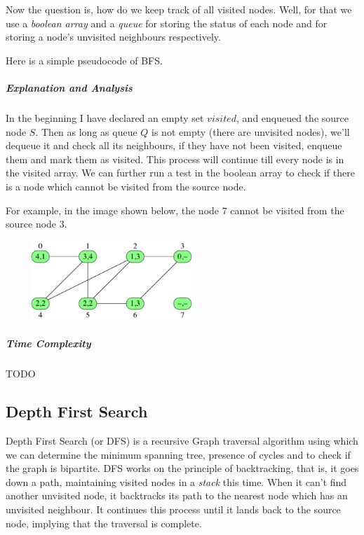 \documentclass[11pt,a4paper]{extarticle}
\begin{document}
Now the question is, how do we keep track of all visited nodes. Well, for that we use a \textit{boolean array} and a \textit{queue} for storing the status of each node and for storing a node's unvisited neighbours respectively. 

Here is a simple pseudocode of BFS. 

\begin{adjustwidth}{2.5em}{0pt}

\end{adjustwidth}

\subparagraph{Explanation and Analysis}
In the beginning I have declared an empty set $visited$, and enqueued the source node $S$. Then as long as queue $Q$ is not empty (there are unvisited nodes), we'll dequeue it and check all its neighbours, if they have not been visited, enqueue them and mark them as visited. This process will continue till every node is in the visited array. We can further run a test in the boolean array to check if there is a node which cannot be visited from the source node.

For example, in the image shown below, the node 7 cannot be visited from the source node 3.

\begin{center}
	\includegraphics[width=8cm, height=3cm]{bfs}
\end{center}

\subparagraph{Time Complexity}
TODO

\subsection{Depth First Search}

Depth First Search (or DFS) is a recursive Graph traversal algorithm using which we can determine the minimum spanning tree, presence of cycles and to check if the graph is bipartite. DFS works on the principle of backtracking, that is, it goes down a path, maintaining visited nodes in a \textit{stack} this time. When it can't find another unvisited node, it backtracks its path to the nearest node which has an unvisited neighbour. It continues this process until it lands back to the source node, implying that the traversal is complete.
\end{document}
